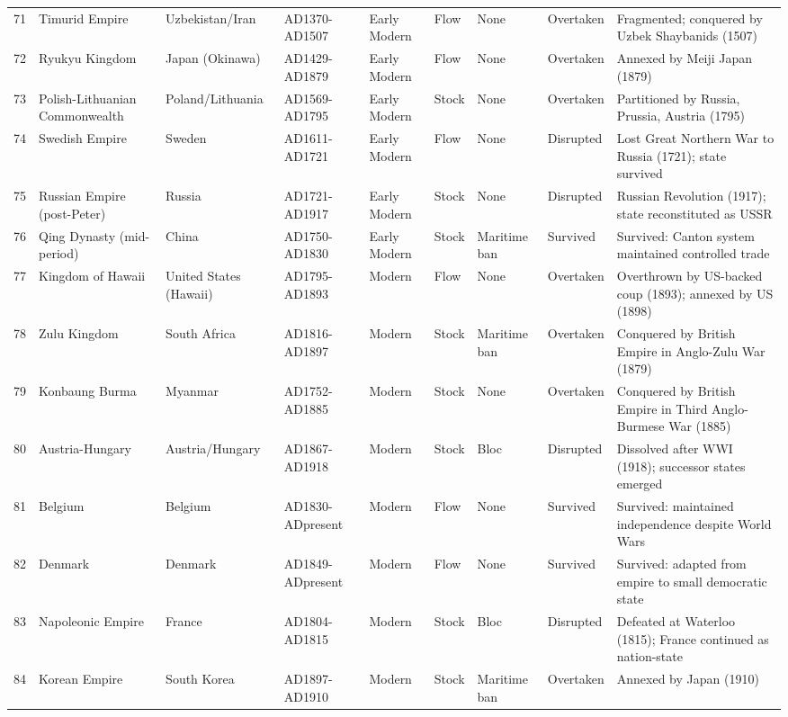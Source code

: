 \documentclass[11pt]{article}
\begin{document}
\begin{longtable}{@{}r l l l l l l l p{5.5cm}@{}}
71 & Timurid Empire & Uzbekistan/Iran & AD1370-AD1507 & Early Modern & Flow & None & Overtaken & Fragmented; conquered by Uzbek Shaybanids (1507) \\
72 & Ryukyu Kingdom & Japan (Okinawa) & AD1429-AD1879 & Early Modern & Flow & None & Overtaken & Annexed by Meiji Japan (1879) \\
73 & Polish-Lithuanian Commonwealth & Poland/Lithuania & AD1569-AD1795 & Early Modern & Stock & None & Overtaken & Partitioned by Russia, Prussia, Austria (1795) \\
74 & Swedish Empire & Sweden & AD1611-AD1721 & Early Modern & Flow & None & Disrupted & Lost Great Northern War to Russia (1721); state survived \\
75 & Russian Empire (post-Peter) & Russia & AD1721-AD1917 & Early Modern & Stock & None & Disrupted & Russian Revolution (1917); state reconstituted as USSR \\
76 & Qing Dynasty (mid-period) & China & AD1750-AD1830 & Early Modern & Stock & Maritime ban & Survived & Survived: Canton system maintained controlled trade \\
77 & Kingdom of Hawaii & United States (Hawaii) & AD1795-AD1893 & Modern & Flow & None & Overtaken & Overthrown by US-backed coup (1893); annexed by US (1898) \\
78 & Zulu Kingdom & South Africa & AD1816-AD1897 & Modern & Stock & Maritime ban & Overtaken & Conquered by British Empire in Anglo-Zulu War (1879) \\
79 & Konbaung Burma & Myanmar & AD1752-AD1885 & Modern & Stock & None & Overtaken & Conquered by British Empire in Third Anglo-Burmese War (1885) \\
80 & Austria-Hungary & Austria/Hungary & AD1867-AD1918 & Modern & Stock & Bloc & Disrupted & Dissolved after WWI (1918); successor states emerged \\
81 & Belgium & Belgium & AD1830-ADpresent & Modern & Flow & None & Survived & Survived: maintained independence despite World Wars \\
82 & Denmark & Denmark & AD1849-ADpresent & Modern & Flow & None & Survived & Survived: adapted from empire to small democratic state \\
83 & Napoleonic Empire & France & AD1804-AD1815 & Modern & Stock & Bloc & Disrupted & Defeated at Waterloo (1815); France continued as nation-state \\
84 & Korean Empire & South Korea & AD1897-AD1910 & Modern & Stock & Maritime ban & Overtaken & Annexed by Japan (1910) \\

\end{longtable}
\end{document}
